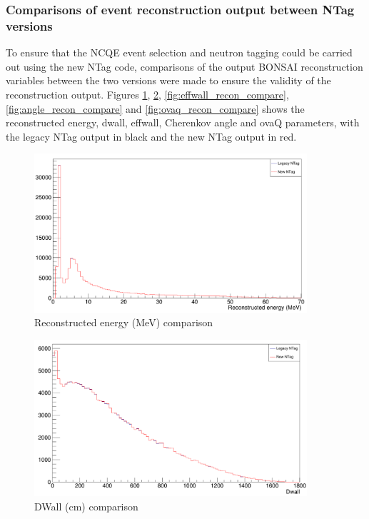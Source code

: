 \subsubsection{Comparisons of event reconstruction output between NTag versions}
To ensure that the NCQE event selection and neutron tagging could be carried out using the new NTag code, comparisons of the output BONSAI reconstruction variables between the two versions were made to ensure the validity of the reconstruction output. Figures \ref{fig:energy_recon_compare}, \ref{fig:dwall_recon_compare}, \ref{fig:effwall_recon_compare}, \ref{fig:angle_recon_compare} and \ref{fig:ovaq_recon_compare}  shows the reconstructed energy, dwall, effwall, Cherenkov angle and ovaQ parameters, with the legacy NTag output in black and the new NTag output in red. 


\begin{figure}
        \centering
        \includegraphics[width=0.9\textwidth]{Figures/energy_recon_compare.PNG}
        \caption{Reconstructed energy (MeV) comparison}
        \label{fig:energy_recon_compare}    
\end{figure}

\begin{figure}
    \centering
    \includegraphics[width=0.9\textwidth]{Figures/dwall_recon_compare.PNG}
    \caption{DWall (cm) comparison}
    \label{fig:dwall_recon_compare}

\end{figure}

